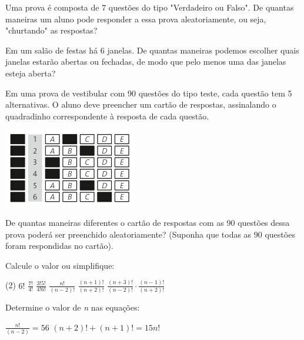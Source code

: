 \documentclass[10pt,a4paper]{article}
\begin{document}
\begin{multicols}{2}
    \begin{question}[type=exam]
        Uma prova é composta de 7 questões do tipo "Verdadeiro ou Falso". De
        quantas maneiras um aluno pode responder a essa prova aleatoriamente,
        ou seja, "churtando" as respostas?
    \end{question}

    \begin{question}[type=exam]
        Em um salão de festas há 6 janelas. De quantas maneiras podemos escolher
        quais janelas estarão abertas ou fechadas, de modo que pelo menos uma das
        janelas esteja aberta?
    \end{question}

    \begin{question}[type=exam]
        Em uma prova de vestibular com 90 questões do tipo teste, cada questão
        tem 5 alternativas. O aluno deve preencher um cartão de respostas,
        assinalando o quadradinho correspondente à resposta de cada questão.
      \begin{Figure}
        \centering
        \includegraphics[scale=.7]{figures/q9.png}
      \end{Figure}
      De quantas maneiras diferentes o cartão de respostas com as 90 questões
      dessa prova poderá ser preenchido aleatoriamente? (Suponha que todas as
      90 questões foram respondidas no cartão).
    \end{question}

    \begin{question}[type=exam]
        Calcule o valor ou simplifique:
        \begin{tasks}(2)
            \task $6!$
            \task $\frac{7!}{4!}$
            \task $\frac{3!5!}{4!6!}$
            \task $\frac{n!}{(n - 2)!}$
            \task $\frac{(n+1)!}{(n+2)!}$
            \task $\frac{(n+3)!}{(n-2)!} \cdot \frac{(n-1)!}{(n+2)!}$
        \end{tasks}
    \end{question}

    \begin{question}[type=exam]
        Determine o valor de \textit{n} nas equações:
        \begin{tasks}
            \task $\frac{n!}{(n-2)} = 56$
            \task $(n+2)! + (n+1)! = 15n!$
        \end{tasks}


\end{question}
\end{multicols}
\end{document}
